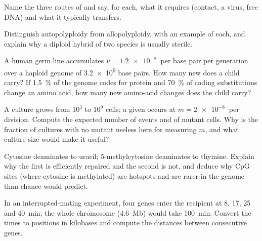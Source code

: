 \begin{exercise}[$\star$]\label{exo:b2:genome-diversification:3}
Name the three routes of  and say, for each,
what it requires (contact, a virus, free DNA) and what it typically
transfers.
\end{exercise}

\begin{exercise}[$\star$]\label{exo:b2:genome-diversification:4}
Distinguish autopolyploidy from allopolyploidy, with an example of
each, and explain why a diploid hybrid of two species is usually
sterile.
\end{exercise}

\begin{exercise}[$\star\star$]\label{exo:b2:genome-diversification:5}
A human germ line accumulates $u = \qty{1.2e-8}{}$  per
base pair per generation over a haploid genome of \qty{3.2e9}{} base
pairs. How many new  does a child carry? If \qty{1.5}{\%}
of the genome codes for protein and \qty{70}{\%} of coding
substitutions change an amino acid, how many new amino-acid changes
does the child carry?
\end{exercise}

\begin{exercise}[$\star\star$]\label{exo:b2:genome-diversification:6}
A culture grows from $10^{3}$ to $10^{9}$ cells; a given 
occurs at $m = \qty{2e-8}{}$ per division. Compute the expected
number of  events and of mutant cells. Why is the fraction
of cultures with no mutant useless here for measuring $m$, and what
culture size would make it useful?
\end{exercise}

\begin{exercise}[$\star\star$]\label{exo:b2:genome-diversification:7}
Cytosine deaminates to uracil; 5-methylcytosine deaminates to
thymine. Explain why the first is efficiently repaired and the
second is not, and deduce why CpG sites (where cytosine is
methylated) are  hotspots and are rarer in the genome than
chance would predict.
\end{exercise}

\begin{exercise}[$\star\star$]\label{exo:b2:genome-diversification:8}
In an interrupted-mating experiment, four genes enter the recipient
at 8, 17, 25 and \qty{40}{min}; the whole chromosome (\qty{4.6}{Mb})
would take \qty{100}{min}. Convert the times to positions in
kilobases and compute the distances between consecutive genes.
\end{exercise}

